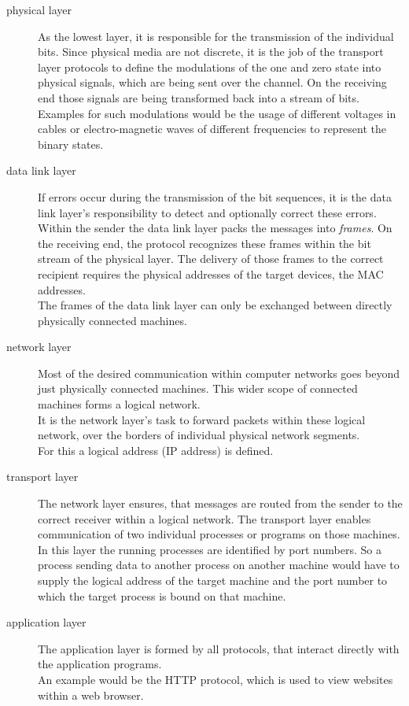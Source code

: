 \begin{description}
\item[physical layer] As the lowest layer, it is responsible for the transmission of the individual bits. Since physical media are not discrete, it is the job of the transport layer protocols to define the modulations of the one and zero state into physical signals, which are being sent over the channel. On the receiving end those signals are being transformed back into a stream of bits. Examples for such modulations would be the usage of different voltages in cables or electro-magnetic waves of different frequencies to represent the binary states.
\item[data link layer] If errors occur during the transmission of the bit sequences, it is the data link layer's responsibility to detect and optionally correct these errors. Within the sender the data link layer packs the messages into \textit{frames}. On the receiving end, the protocol recognizes these frames within the bit stream of the physical layer. The delivery of those frames to the correct recipient requires the physical addresses of the target devices, the MAC addresses.\\
The frames of the data link layer can only be exchanged between directly physically connected machines.
\item[network layer] Most of the desired communication within computer networks goes beyond just physically connected machines. This wider scope of connected machines forms a logical network.\\
It is the network layer's task to forward packets within these logical network, over the borders of individual physical network segments.\\
For this a logical address (IP address) is defined.
\item[transport layer] The network layer ensures, that messages are routed from the sender to the correct receiver within a logical network. The transport layer enables communication of two individual processes or programs on those machines.\\
In this layer the running processes are identified by port numbers. So a process sending data to another process on another machine would have to supply the logical address of the target machine and the port number to which the target process is bound on that machine.
\item[application layer] The application layer is formed by all protocols, that interact directly with the application programs.\\
An example would be the HTTP protocol, which is used to view websites within a web browser. 
\end{description}

